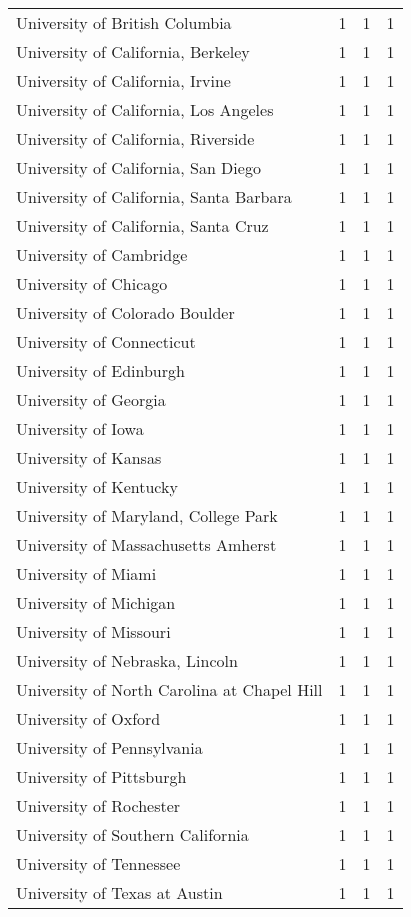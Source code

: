\begin{longtable}[t]{llll}
University of British Columbia & 1 & 1 & 1\\
University of California, Berkeley & 1 & 1 & 1\\
\addlinespace
University of California, Irvine & 1 & 1 & 1\\
University of California, Los Angeles & 1 & 1 & 1\\
University of California, Riverside & 1 & 1 & 1\\
University of California, San Diego & 1 & 1 & 1\\
University of California, Santa Barbara & 1 & 1 & 1\\
\addlinespace
University of California, Santa Cruz & 1 & 1 & 1\\
University of Cambridge & 1 & 1 & 1\\
University of Chicago & 1 & 1 & 1\\
University of Colorado Boulder & 1 & 1 & 1\\
University of Connecticut & 1 & 1 & 1\\
\addlinespace
University of Edinburgh & 1 & 1 & 1\\
University of Georgia & 1 & 1 & 1\\
University of Iowa & 1 & 1 & 1\\
University of Kansas & 1 & 1 & 1\\
University of Kentucky & 1 & 1 & 1\\
\addlinespace
University of Maryland, College Park & 1 & 1 & 1\\
University of Massachusetts Amherst & 1 & 1 & 1\\
University of Miami & 1 & 1 & 1\\
University of Michigan & 1 & 1 & 1\\
University of Missouri & 1 & 1 & 1\\
\addlinespace
University of Nebraska, Lincoln & 1 & 1 & 1\\
University of North Carolina at Chapel Hill & 1 & 1 & 1\\
University of Oxford & 1 & 1 & 1\\
University of Pennsylvania & 1 & 1 & 1\\
University of Pittsburgh & 1 & 1 & 1\\
\addlinespace
University of Rochester & 1 & 1 & 1\\
University of Southern California & 1 & 1 & 1\\
University of Tennessee & 1 & 1 & 1\\
University of Texas at Austin & 1 & 1 & 1\\

\end{longtable}
